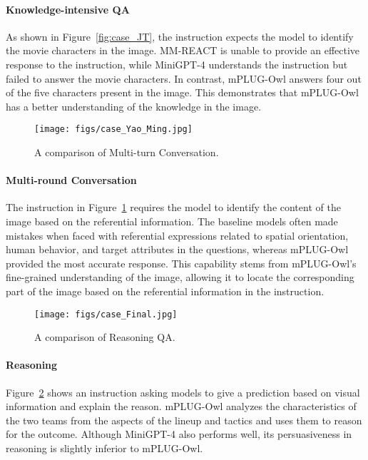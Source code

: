 \documentclass{article}
\newcommand{\modelname}{mPLUG-Owl\xspace}
\begin{document}
\paragraph{Knowledge-intensive QA}
As shown in Figure~\ref{fig:case_JT}, the instruction expects the model to identify the movie characters in the image. MM-REACT is unable to provide an effective response to the instruction, while MiniGPT-4 understands the instruction but failed to answer the movie characters. In contrast, \modelname answers four out of the five characters present in the image. This demonstrates that \modelname has a better understanding of the knowledge in the image.

\begin{figure}[!ht]
    \centering
    \texttt{[image: figs/case\_Yao\_Ming.jpg]}
    \caption{A comparison of Multi-turn Conversation.}
    \label{fig:case_Yao_Ming}
    \vspace{-2mm}
\end{figure}


\paragraph{Multi-round Conversation}
The instruction in Figure~\ref{fig:case_Yao_Ming} requires the model to identify the content of the image based on the referential information. The baseline models often made mistakes when faced with referential expressions related to spatial orientation, human behavior, and target attributes in the questions, whereas \modelname provided the most accurate response. This capability stems from \modelname's fine-grained understanding of the image, allowing it to locate the corresponding part of the image based on the referential information in the instruction.

\begin{figure}[!ht]
    \centering
    \texttt{[image: figs/case\_Final.jpg]}
    \caption{A comparison of Reasoning QA.}
    \label{fig:case_Final}
    \vspace{-2mm}
\end{figure}

\paragraph{Reasoning}
Figure~\ref{fig:case_Final} shows an instruction asking models to give a prediction based on visual information and explain the reason. 
\modelname analyzes the characteristics of the two teams from the aspects of the lineup and tactics and uses them to reason for the outcome. Although MiniGPT-4 also performs well, its persuasiveness in reasoning is slightly inferior to \modelname.
\end{document}
